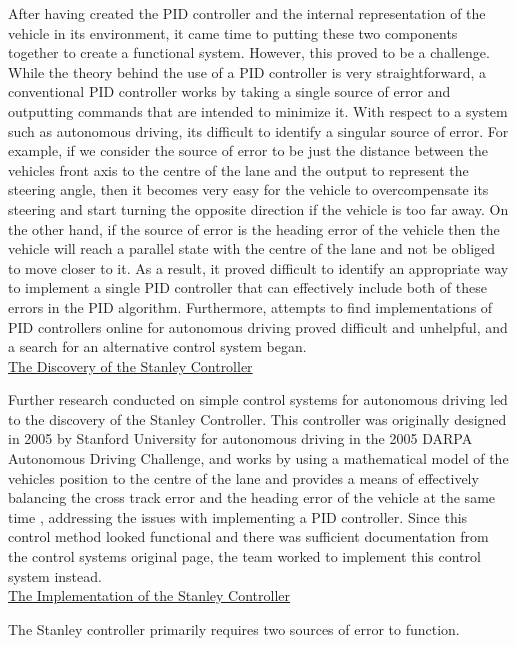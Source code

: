 \documentclass[titlepage,draft]{article}
\begin{document}
{After having created the PID controller and the internal representation of the vehicle in its environment, it came time to putting these two components together to create a functional system. However, this proved to be a challenge. While the theory behind the use of a PID controller is very straightforward, a conventional PID controller works by taking a single source of error and outputting commands that are intended to minimize it. With respect to a system such as autonomous driving, its difficult to identify a singular source of error. For example, if we consider the source of error to be just the distance between the vehicles front axis to the centre of the lane and the output to represent the steering angle, then it becomes very easy for the vehicle to overcompensate its steering and start turning the opposite direction if the vehicle is too far away. On the other hand, if the source of error is the heading error of the vehicle then the vehicle will reach a parallel state with the centre of the lane and not be obliged to move closer to it. As a result, it proved difficult to identify an appropriate way to implement a single PID controller that can effectively include both of these errors in the PID algorithm. Furthermore, attempts to find implementations of PID controllers online for autonomous driving proved difficult and unhelpful, and a search for an alternative control system began.
\\

\underline{The Discovery of the Stanley Controller}

Further research conducted on simple control systems for autonomous driving led to the discovery of the Stanley Controller. This controller was originally designed in 2005 by Stanford University for autonomous driving in the 2005 DARPA Autonomous Driving Challenge, and works by using a mathematical model of the vehicles position to the centre of the lane and provides a means of effectively balancing the cross track error and the heading error of the vehicle at the same time \cite{4282788}, addressing the issues with implementing a PID controller. Since this control method looked functional and there was sufficient documentation from the control systems original page, the team worked to implement this control system instead.
\\

\underline{The Implementation of the Stanley Controller}

The Stanley controller primarily requires two sources of error to function.

}
\end{document}
